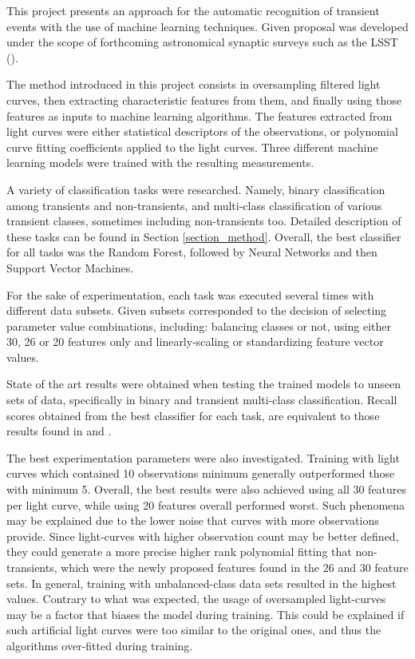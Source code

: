 This project presents an approach for the automatic recognition of transient events with the use of machine learning techniques. Given proposal was developed under the scope of forthcoming astronomical synaptic surveys such as the LSST (\cite{0805.2366}).

The method introduced in this project consists in oversampling filtered light curves, then extracting characteristic features from them, and finally using those features as inputs to machine learning algorithms. The features extracted from light curves were either statistical descriptors of the observations, or polynomial curve fitting coefficients applied to the light curves.  
Three different machine learning models were trained with the resulting measurements.

A variety of classification tasks were researched. Namely, binary classification among transients and non-transients, and multi-class classification of various transient classes, sometimes including non-transients too. Detailed description of these tasks can be found in Section \ref{section_method}. 
Overall, the best classifier for all tasks was the Random Forest, followed by Neural Networks and then Support Vector Machines.

For the sake of experimentation, each task was executed several times with different data subsets. Given subsets corresponded to the decision of selecting parameter value combinations, including: balancing classes or not, using either 30, 26 or 20 features only and linearly-scaling or standardizing feature vector values.

State of the art results were obtained when testing the trained models to unseen sets of data, specifically in binary and transient multi-class classification. Recall scores obtained from the best classifier for each task, are equivalent to those results found in \cite{1401.3211} and \cite{1601.03931}.


The best experimentation parameters were also investigated. 
Training with light curves which contained 10 observations minimum generally outperformed those with minimum 5. Overall, the best results were also achieved using all 30 features per light curve, while using 20 features overall performed worst. Such phenomena may be explained due to the lower noise that curves with more observations provide.
Since light-curves with higher observation count may be better defined, they could generate a more precise higher rank polynomial fitting that non-transients, which were the newly proposed features found in the 26 and 30 feature sets.
In general, training with unbalanced-class data sets resulted in the highest values. Contrary to what was expected, the usage of oversampled light-curves may be a factor that biases the model during training. This could be explained if such artificial light curves were too similar to the original ones, and thus the algorithms over-fitted during training.

